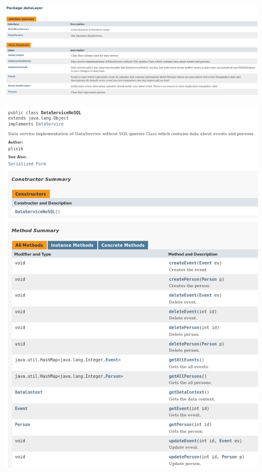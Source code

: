 \documentclass[a4paper,12pt]{article}
\begin{document}
\begin{minipage}{\textwidth}

    \includegraphics[width=\textwidth]{./screen/dataLayer/PackageDataLayer.png}
    \label{dataLayer_pkg}

\end{minipage}

\begin{minipage}{\textwidth}

    \includegraphics[width=\textwidth]{./screen/dataLayer/DataServiceNoSQL.png}
    \label{DataServiceNoSQL}

\end{minipage}
\end{document}
